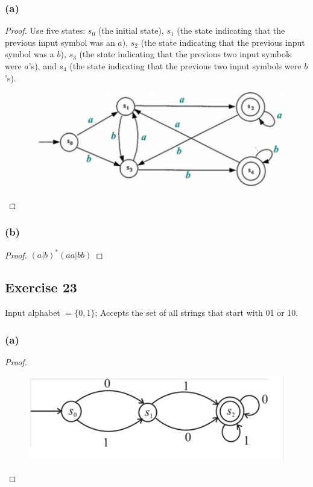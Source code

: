 \documentclass[14pt]{extarticle}
\begin{document}
\subsubsection{(a)}
\begin{proof}
Use five states: \(s_0\) (the initial state), \(s_1\) (the state indicating that the previous input symbol was an \(a\)), 
\(s_2\) (the state indicating that the previous input symbol was a \(b\)), \(s_3\) (the state indicating that the previous 
two input symbols were \(a\)’s), and \(s_4\) (the state indicating that the previous two input symbols were \(b\)’s).

\begin{figure}[ht!]
\centering
\includegraphics[scale=0.3]{../images/12.2.22.a.png}
\end{figure}
\end{proof}

\subsubsection{(b)}
\begin{proof}
\((a|b)^*(aa|bb)\)
\end{proof}

\subsection{Exercise 23}
Input alphabet \(= \{0, 1\}\); Accepts the set of all strings that start with 01 or 10.

\subsubsection{(a)}
\begin{proof}
\begin{figure}[ht!]
\centering
\includegraphics[scale=0.3]{../images/12.2.23.a.png}
\end{figure}
\end{proof}
\end{document}
